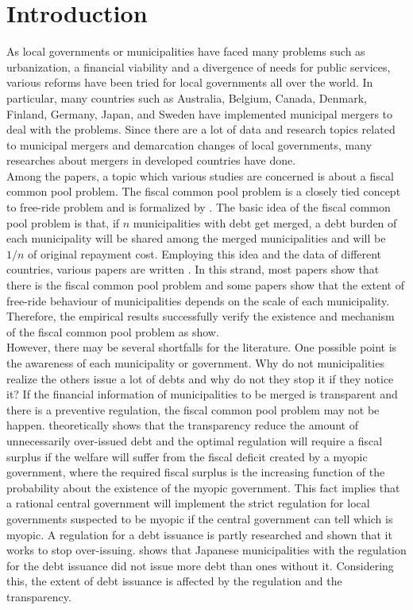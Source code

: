 \documentclass[dvipdfmx]{jsarticle}
\begin{document}
\section{Introduction}
\quad As local governments or municipalities have faced many problems such as urbanization, a financial viability and a divergence of needs for public services, various reforms have been tried for local governments all over the world. In particular, many countries such as Australia, Belgium, Canada, Denmark, Finland, Germany, Japan, and Sweden have implemented municipal mergers to deal with the problems. Since there are a lot of data and research topics related to municipal mergers and demarcation changes of local governments, many researches about mergers in developed countries have done.\\
\quad Among the papers, a topic which various studies are concerned is about a fiscal common pool problem. The fiscal common pool problem is a closely tied concept to free-ride problem and is formalized by \cite{Weingast1981}. The basic idea of the fiscal common pool problem is that, if $n$ municipalities with debt get merged, a debt burden of each municipality will be shared among the merged municipalities and will be $1/n$ of original repayment cost. Employing this idea and the data of different countries, various papers are written \citep{Allers2016, Blom-Hansen2010, Frid2015, Hansen2014, Hinnerich2009, Hirota2017a, Jordahl2010, Nakazawa2016}. In this strand, most papers show that there is the fiscal common pool problem and some papers show that the extent of free-ride behaviour of municipalities depends on the scale of each municipality. Therefore, the empirical results successfully verify the existence and mechanism of the fiscal common pool problem as \cite{Weingast1981} show.\\
\quad However, there may be several shortfalls for the literature. One possible point is the awareness of each municipality or government. Why do not municipalities realize the others issue a lot of debts and why do not they stop it if they notice it? If the financial information of municipalities to be merged is transparent and there is a preventive regulation, the fiscal common pool problem may not be happen. \cite{Milesi-Ferretti2003} theoretically shows that the transparency reduce the amount of unnecessarily over-issued debt and the optimal regulation will require a fiscal surplus if the welfare will suffer from the fiscal deficit created by a myopic government, where the required fiscal surplus is the increasing function of the probability about the existence of the myopic government. This fact implies that a rational central government will implement the strict regulation for local governments suspected to be myopic if the central government can tell which is myopic. A regulation for a debt issuance is partly researched and shown that it works to stop over-issuing. \cite{Nakazawa2016} shows that Japanese municipalities with the regulation for the debt issuance did not issue more debt than ones without it. Considering this, the extent of debt issuance is affected by the regulation and the transparency. \\ 
\end{document}
